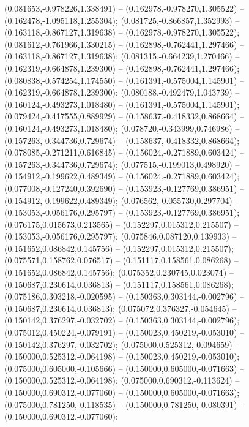  (0.081653,-0.978226,1.338491) -- (0.162978,-0.978270,1.305522) -- (0.162478,-1.095118,1.255304);
 (0.081725,-0.866857,1.352993) -- (0.163118,-0.867127,1.319638) -- (0.162978,-0.978270,1.305522);
 (0.081612,-0.761966,1.330215) -- (0.162898,-0.762441,1.297466) -- (0.163118,-0.867127,1.319638);
 (0.081315,-0.664239,1.270466) -- (0.162319,-0.664878,1.239300) -- (0.162898,-0.762441,1.297466);
 (0.080838,-0.574254,1.174550) -- (0.161391,-0.575004,1.145901) -- (0.162319,-0.664878,1.239300);
 (0.080188,-0.492479,1.043739) -- (0.160124,-0.493273,1.018480) -- (0.161391,-0.575004,1.145901);
 (0.079424,-0.417555,0.889929) -- (0.158637,-0.418332,0.868664) -- (0.160124,-0.493273,1.018480);
 (0.078720,-0.343999,0.746986) -- (0.157263,-0.344736,0.729674) -- (0.158637,-0.418332,0.868664);
 (0.078085,-0.271211,0.616845) -- (0.156024,-0.271889,0.603424) -- (0.157263,-0.344736,0.729674);
 (0.077515,-0.199013,0.498920) -- (0.154912,-0.199622,0.489349) -- (0.156024,-0.271889,0.603424);
 (0.077008,-0.127240,0.392690) -- (0.153923,-0.127769,0.386951) -- (0.154912,-0.199622,0.489349);
 (0.076562,-0.055730,0.297704) -- (0.153053,-0.056176,0.295797) -- (0.153923,-0.127769,0.386951);
 (0.076175,0.015673,0.213565) -- (0.152297,0.015312,0.215507) -- (0.153053,-0.056176,0.295797);
 (0.075846,0.087120,0.139933) -- (0.151652,0.086842,0.145756) -- (0.152297,0.015312,0.215507);
 (0.075571,0.158762,0.076517) -- (0.151117,0.158561,0.086268) -- (0.151652,0.086842,0.145756);
 (0.075352,0.230745,0.023074) -- (0.150687,0.230614,0.036813) -- (0.151117,0.158561,0.086268);
 (0.075186,0.303218,-0.020595) -- (0.150363,0.303144,-0.002796) -- (0.150687,0.230614,0.036813);
 (0.075072,0.376327,-0.054645) -- (0.150142,0.376297,-0.032702) -- (0.150363,0.303144,-0.002796);
 (0.075012,0.450224,-0.079191) -- (0.150023,0.450219,-0.053010) -- (0.150142,0.376297,-0.032702);
 (0.075000,0.525312,-0.094659) -- (0.150000,0.525312,-0.064198) -- (0.150023,0.450219,-0.053010);
 (0.075000,0.605000,-0.105666) -- (0.150000,0.605000,-0.071663) -- (0.150000,0.525312,-0.064198);
 (0.075000,0.690312,-0.113624) -- (0.150000,0.690312,-0.077060) -- (0.150000,0.605000,-0.071663);
 (0.075000,0.781250,-0.118535) -- (0.150000,0.781250,-0.080391) -- (0.150000,0.690312,-0.077060);
